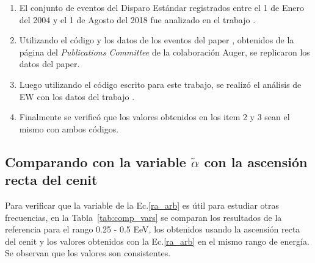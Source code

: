 \begin{enumerate}
    \item El conjunto de eventos del Disparo Estándar registrados entre el 1 de Enero del 2004 y el 1 de Agosto del 2018 fue analizado en el trabajo \cite{Aab_2020}.
    \item Utilizando el código y los datos de los eventos del paper \cite{Aab_2020}, obtenidos de la página del \emph{Publications Committee} de la colaboración Auger, se replicaron los datos del paper. 
    \item Luego utilizando el código escrito para este trabajo, se realizó el análisis de EW con los datos del trabajo \cite{Aab_2020}. 
    \item Finalmente se verificó que los valores obtenidos en los item 2 y 3 sean el mismo con  ambos códigos.
\end{enumerate}

\subsection{Comparando con la variable $\tilde{\alpha}$ con la ascensión recta del cenit }

Para verificar que la variable de la Ec.\ref{ra_arb} es útil para estudiar otras frecuencias, en la Tabla~\ref{tab:comp_vars} se comparan los resultados de la referencia para el rango 0.25 - 0.5 EeV, los obtenidos usando la ascensión recta del cenit y los valores obtenidos con la Ec.\ref{ra_arb} en el mismo rango de energía. Se observan que los valores son consistentes.

